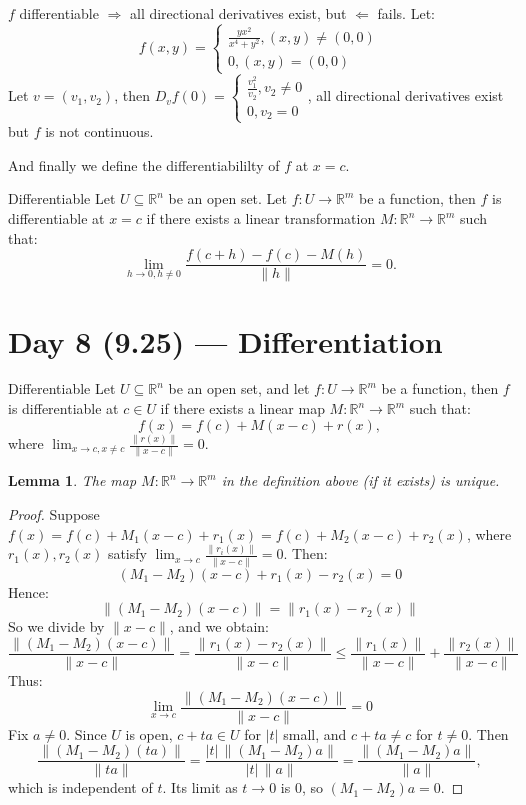 \documentclass[11pt]{article}
\makeatletter
\newcounter{thmcounter}
\newenvironment{definition}[1]{\begin{defbox}{#1}{}}{\end{defbox}}
\newenvironment{example}[1]{\begin{exbox}{#1}{}}{\end{exbox}}
\theoremstyle{quiet}
\newtheorem{lemma}[thmcounter]{Lemma}
\newtheorem{lemma}[tcb@cnt@defbox]{Lemma}
\theoremstyle{quietremark}
\makeatother
\begin{document}
\begin{example}{}
$f$ differentiable $\Rightarrow$ all directional derivatives exist, but $\Leftarrow$ fails. 
Let:
\[
f(x,y)=\begin{cases}\frac{yx^2}{x^4+y^2}, (x,y)\ne (0,0)\\0, (x,y)=(0,0)\end{cases}
\]
Let $v=(v_1,v_2)$, then $D_vf(0)=\begin{cases}\frac{v_1^2}{v_2}, v_2\ne 0\\0,v_2=0\end{cases}$, all directional derivatives exist but $f$ is not continuous.
\end{example}

And finally we define the differentiabililty of $f$ at $x=c$.
\begin{definition}{Differentiable}
Let $U\subseteq\mathbb{R}^n$ be an open set. Let $f:U\to\mathbb{R}^m$ be a function, then $f$ is differentiable at $x=c$ if there exists a linear transformation $M:\mathbb{R}^n\to\mathbb{R}^m$ such that:
\[
\lim_{h\to 0,h\ne 0}\frac{f(c+h)-f(c)-M(h)}{\|h\|}=0.
\]
\end{definition}

\newpage
\section{Day 8 (9.25) --- Differentiation}
\begin{definition}{Differentiable}
Let $U\subseteq\mathbb{R}^n$ be an open set, and let $f:U\to\mathbb{R}^m$ be a function, then $f$ is differentiable at $c\in U$ if there exists a linear map $M:\mathbb{R}^n\to\mathbb{R}^m$ such that:
\[
f(x)=f(c)+M(x-c)+r(x),
\]
where $\displaystyle\lim_{x\to c,x\ne c}\frac{\|r(x)\|}{\|x-c\|}=0.$
\end{definition}

\begin{lemma}{}
The map $M:\mathbb{R}^n\to\mathbb{R}^m$ in the definition above (if it exists) is unique.
\end{lemma}

\begin{proof}
Suppose $f(x)=f(c)+M_1(x-c)+r_1(x)=f(c)+M_2(x-c)+r_2(x)$,
where $r_1(x),r_2(x)$ satisfy $\displaystyle\lim_{x\to c}\frac{\|r_i(x)\|}{\|x-c\|}=0$. Then:
\[
(M_1-M_2)(x-c)+r_1(x)-r_2(x)=0
\]
Hence:
\[
\|(M_1-M_2)(x-c)\|=\|r_1(x)-r_2(x)\|
\]
So we divide by $\|x-c\|$, and we obtain:
\[
\frac{\|(M_1-M_2)(x-c)\|}{\|x-c\|}=\frac{\|r_1(x)-r_2(x)\|}{\|x-c\|}\le\frac{\|r_1(x)\|}{\|x-c\|}+\frac{\|r_2(x)\|}{\|x-c\|}
\]
Thus:
\[
\lim_{x\to c}\frac{\|(M_1-M_2)(x-c)\|}{\|x-c\|}=0
\]
Fix $a\ne 0$. Since $U$ is open, $c+ta\in U$ for $|t|$ small, and $c+ta\ne c$ for $t\ne 0$. Then
\[
\frac{\|(M_1-M_2)(ta)\|}{\|ta\|}=\frac{|t|\,\|(M_1-M_2)a\|}{|t|\,\|a\|}=\frac{\|(M_1-M_2)a\|}{\|a\|},
\]
which is independent of $t$. Its limit as $t\to0$ is $0$, so $(M_1-M_2)a=0$.
\end{proof}
\end{document}
